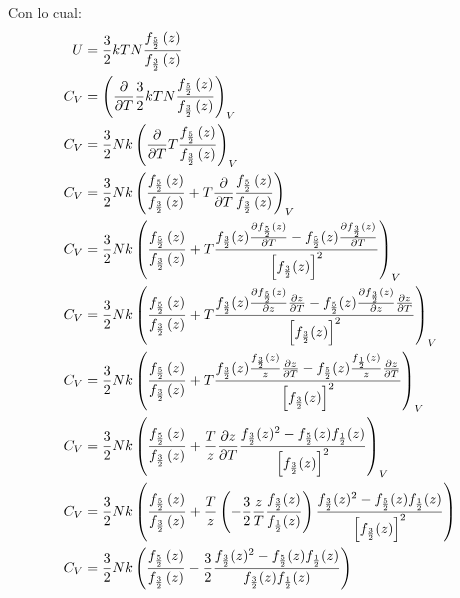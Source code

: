 \documentclass{report}
\begin{document}
Con lo cual:
\begin{align*}
  U &= \frac{3}{2}kT N\frac{f_{\frac{5}{2}}\paren{z}}{f_{\frac{3}{2}}\paren{z}}\\
  C_V &= \paren{\frac{\partial}{\partial T} \frac{3}{2}kT N\frac{f_{\frac{5}{2}}\paren{z}}{f_{\frac{3}{2}}\paren{z}} }_{V}\\
  C_V &= \frac{3}{2}Nk\paren{\frac{\partial}{\partial T} T \frac{f_{\frac{5}{2}}\paren{z}}{f_{\frac{3}{2}}\paren{z}} }_{V}\\
  C_V &= \frac{3}{2}Nk\paren{ \frac{f_{\frac{5}{2}}\paren{z}}{f_{\frac{3}{2}}\paren{z}} + T\frac{\partial}{\partial T} \frac{f_{\frac{5}{2}}\paren{z}}{f_{\frac{3}{2}}\paren{z}} }_{V}\\
  C_V &= \frac{3}{2}Nk\paren{ \frac{f_{\frac{5}{2}}\paren{z}}{f_{\frac{3}{2}}\paren{z}} + T\frac{f_{\frac{3}{2}}(z) \frac{\partial f_{\frac{5}{2}}(z)}{\partial T} - f_{\frac{5}{2}}(z) \frac{\partial f_{\frac{3}{2}}(z)}{\partial T}}{\left[f_{\frac{3}{2}}(z)\right]^2} }_{V}\\
  C_V &= \frac{3}{2}Nk\paren{ \frac{f_{\frac{5}{2}}\paren{z}}{f_{\frac{3}{2}}\paren{z}} + T\frac{f_{\frac{3}{2}}(z) \frac{\partial f_{\frac{5}{2}}(z)}{\partial z} \frac{\partial z}{\partial T} - f_{\frac{5}{2}}(z) \frac{\partial f_{\frac{3}{2}}(z)}{\partial z}\frac{\partial z}{\partial T}}{\left[f_{\frac{3}{2}}(z)\right]^2} }_{V}\\
  C_V &= \frac{3}{2}Nk\paren{ \frac{f_{\frac{5}{2}}\paren{z}}{f_{\frac{3}{2}}\paren{z}} + T\frac{f_{\frac{3}{2}}(z) \frac{f_{\frac{3}{2}}(z)}{z} \frac{\partial z}{\partial T} - f_{\frac{5}{2}}(z) \frac{f_{\frac{1}{2}}(z)}{z}\frac{\partial z}{\partial T}}{\left[f_{\frac{3}{2}}(z)\right]^2} }_{V}\\
  C_V &= \frac{3}{2}Nk\paren{ \frac{f_{\frac{5}{2}}\paren{z}}{f_{\frac{3}{2}}\paren{z}} + \frac{T}{z} \frac{\partial z}{\partial T}\frac{f_{\frac{3}{2}}(z)^2   - f_{\frac{5}{2}}(z) f_{\frac{1}{2}}(z)}{\left[f_{\frac{3}{2}}(z)\right]^2} }_{V}\\
  C_V &= \frac{3}{2}Nk\paren{ \frac{f_{\frac{5}{2}}\paren{z}}{f_{\frac{3}{2}}\paren{z}} + \frac{T}{z} \paren{-\frac{3}{2}\frac{z}{T}\frac{f_{\frac{3}{2}}(z)}{f_{\frac{1}{2}}(z)}}\frac{f_{\frac{3}{2}}(z)^2   - f_{\frac{5}{2}}(z) f_{\frac{1}{2}}(z)}{\left[f_{\frac{3}{2}}(z)\right]^2} }\\
  C_V &= \frac{3}{2}Nk\paren{ \frac{f_{\frac{5}{2}}\paren{z}}{f_{\frac{3}{2}}\paren{z}} - \frac{3}{2}\frac{f_{\frac{3}{2}}(z)^2   - f_{\frac{5}{2}}(z) f_{\frac{1}{2}}(z)}{f_{\frac{3}{2}}(z)f_{\frac{1}{2}}(z)} }\\

\end{align*}
\end{document}
